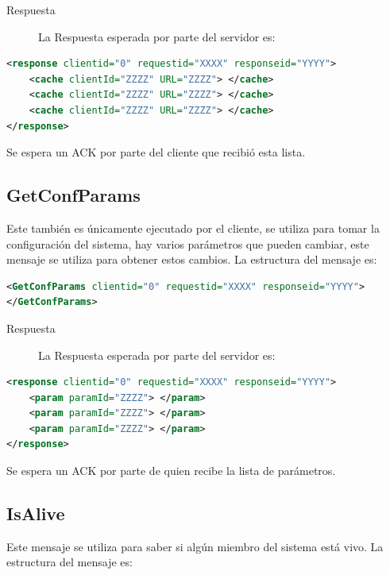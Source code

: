 \begin{description}
\item[Respuesta] La Respuesta esperada por parte del servidor es:
\end{description}

\begin{lstlisting}[language=XML,caption=Mensaje de Respuesta de GetTopCachesbyObject]
<response clientid="0" requestid="XXXX" responseid="YYYY"> 
	<cache clientId="ZZZZ" URL="ZZZZ"> </cache>
	<cache clientId="ZZZZ" URL="ZZZZ"> </cache>
	<cache clientId="ZZZZ" URL="ZZZZ"> </cache>
</response>
\end{lstlisting}


Se espera un ACK por parte del cliente que recibió esta lista.

\subsection{GetConfParams}
Este también es únicamente ejecutado por el cliente, se utiliza para tomar la configuración del sistema, hay varios parámetros que pueden cambiar, este mensaje se utiliza para obtener estos cambios. La estructura del mensaje es:

\begin{lstlisting}[language=XML,caption=Mensaje de GetConfParams]
<GetConfParams clientid="0" requestid="XXXX" responseid="YYYY"> 
</GetConfParams>
\end{lstlisting}


\begin{description}
\item[Respuesta] La Respuesta esperada por parte del servidor es:
\end{description}

\begin{lstlisting}[language=XML,caption=Mensaje de Respuesta de GetConfParams]
<response clientid="0" requestid="XXXX" responseid="YYYY"> 
	<param paramId="ZZZZ"> </param>
	<param paramId="ZZZZ"> </param>
	<param paramId="ZZZZ"> </param>
</response>
\end{lstlisting}


Se espera un ACK por parte de quien recibe la lista de parámetros.

\subsection{IsAlive}

Este mensaje se utiliza para saber si algún miembro del sistema está vivo. La estructura del mensaje es:

